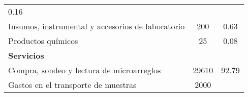 \documentclass[a4paper]{article}
\begin{document}
\begin{longtable}[]{@{}lcc@{}}
\begin{minipage}[t]{0.22\columnwidth}
0.16\strut
\end{minipage}\tabularnewline
\begin{minipage}[t]{0.46\columnwidth}\raggedright\strut
Insumos, instrumental y accesorios de laboratorio\strut
\end{minipage} & \begin{minipage}[t]{0.22\columnwidth}\centering\strut
200\strut
\end{minipage} & \begin{minipage}[t]{0.22\columnwidth}\centering\strut
0.63\strut
\end{minipage}\tabularnewline
\begin{minipage}[t]{0.46\columnwidth}\raggedright\strut
Productos químicos\strut
\end{minipage} & \begin{minipage}[t]{0.22\columnwidth}\centering\strut
25\strut
\end{minipage} & \begin{minipage}[t]{0.22\columnwidth}\centering\strut
0.08\strut
\end{minipage}\tabularnewline
\begin{minipage}[t]{0.46\columnwidth}\raggedright\strut
\textbf{Servicios}\strut
\end{minipage} & \begin{minipage}[t]{0.22\columnwidth}\centering\strut
\strut
\end{minipage} & \begin{minipage}[t]{0.22\columnwidth}\centering\strut
\strut
\end{minipage}\tabularnewline
\begin{minipage}[t]{0.46\columnwidth}\raggedright\strut
Compra, sondeo y lectura de microarreglos\strut
\end{minipage} & \begin{minipage}[t]{0.22\columnwidth}\centering\strut
29610\strut
\end{minipage} & \begin{minipage}[t]{0.22\columnwidth}\centering\strut
92.79\strut
\end{minipage}\tabularnewline
\begin{minipage}[t]{0.46\columnwidth}\raggedright\strut
Gastos en el transporte de muestras\strut
\end{minipage} & \begin{minipage}[t]{0.22\columnwidth}\centering\strut
2000\strut
\end{minipage} & \begin{minipage}[t]{0.22\columnwidth}\centering\strut

\end{minipage}
\end{longtable}
\end{document}

